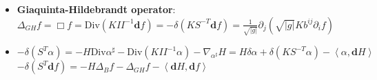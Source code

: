 \documentclass{scrartcl}
\newcommand{\exd}{\mathbf{d}}
\newcommand{\Div}{\text{Div}}
\begin{document}
\begin{itemize}
      \item \textbf{Giaquinta-Hildebrandt operator}:\\
        \( \Delta_{GH}f = \Box f = \text{Div}\left( K II^{-1} \exd f \right)
                                = -\delta\left( KS^{-T}\exd f \right)
                                = \frac{1}{\sqrt{|g|}}\partial_{j}\left( \sqrt{|g|}K b^{ij}\partial_{i}f \right)\)
      \item 
        \( -\delta\left( S^{T}\alpha \right) = -H\Div \alpha^{\sharp} - \Div\left(  K II^{-1} \alpha \right) - \nabla_{\alpha^{\sharp}}H
                            = H\delta\alpha + \delta\left( KS^{-T}\alpha \right) - \left\langle \alpha , \exd H \right\rangle\) 
        \( -\delta\left( S^{T}\exd f \right) = -H\Delta_{B}f - \Delta_{GH}f - \left\langle \exd H , \exd f \right\rangle \)
    \end{itemize}
\end{document}
